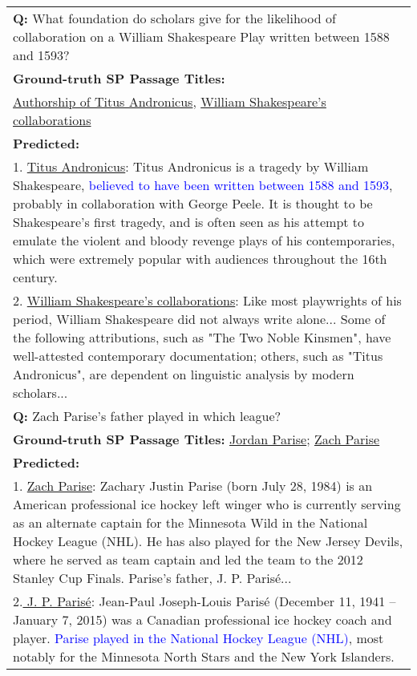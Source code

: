 \begin{table*}[h]
\begin{tabular}{p{}}
    \midrule
    \textbf{Q:} What foundation do scholars give for the likelihood of collaboration on a William Shakespeare Play written between 1588 and 1593? \\
    \textbf{Ground-truth SP Passage Titles:}\\ \underline{Authorship of Titus Andronicus}, \underline{William Shakespeare's collaborations}\\
    \textbf{Predicted:}\\
    1. \underline{Titus Andronicus}: Titus Andronicus is a tragedy by William Shakespeare, \textcolor{blue}{believed to have been written between 1588 and 1593}, probably in collaboration with George Peele. It is thought to be Shakespeare's first tragedy, and is often seen as his attempt to emulate the violent and bloody revenge plays of his contemporaries, which were extremely popular with audiences throughout the 16th century.\\
    2. \underline{William Shakespeare's collaborations}:  Like most playwrights of his period, William Shakespeare did not always write alone... Some of the following attributions, such as "The Two Noble Kinsmen", have well-attested contemporary documentation; others, such as "Titus Andronicus", are dependent on linguistic analysis by modern scholars...\\
    \midrule 
    \textbf{Q:} Zach Parise's father played in which league? \\
    \textbf{Ground-truth SP Passage Titles:} \underline{Jordan Parise}; \underline{Zach Parise} \\
    \textbf{Predicted:}\\
    1. \underline{Zach Parise}: Zachary Justin Parise (born July 28, 1984) is an American professional ice hockey left winger who is currently serving as an alternate captain for the Minnesota Wild in the National Hockey League (NHL). He has also played for the New Jersey Devils, where he served as team captain and led the team to the 2012 Stanley Cup Finals. Parise's father, J. P. Parisé... \\
    2.\underline{ J. P. Parisé}: Jean-Paul Joseph-Louis Parisé (December 11, 1941 – January 7, 2015) was a Canadian professional ice hockey coach and player. \textcolor{blue}{Parise played in the National Hockey League (NHL)}, most notably for the Minnesota North Stars and the New York Islanders. \\
    \bottomrule
    \end{tabular}
    
    \label{tab:bridge_errors}
\end{table*}

